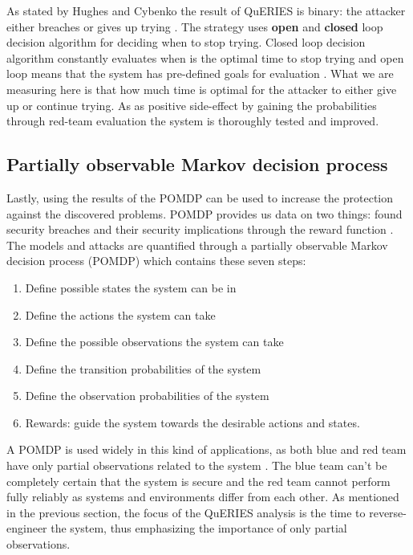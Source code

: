 As stated by Hughes and Cybenko the result of QuERIES is binary: the
attacker either breaches or gives up trying
\cite{hughes2013quantitative}. The strategy uses \textbf{open} and 
\textbf{closed} loop decision algorithm for deciding when to stop
trying. Closed loop decision algorithm constantly evaluates when is
the optimal time to stop trying and open loop means that the system
has pre-defined goals for evaluation
\cite{carin2008cybersecurity}. What we are measuring here is that how
much time is optimal for the attacker to either give up or continue
trying. As as positive side-effect by gaining the probabilities
through red-team evaluation the system is thoroughly tested and improved.

\subsection{Partially observable Markov decision process}

Lastly, using the results of the POMDP can be used to increase the
protection against the discovered problems. POMDP provides us data on
two things: found security breaches and their security implications
through the reward function \cite{carin2008cybersecurity}.  The models
and attacks are quantified through a partially observable Markov
decision process (POMDP) which contains these seven steps:

\begin{enumerate}
    \item Define possible states the system can be in
    \item Define the actions the system can take
    \item Define the possible observations the system can take
    \item Define the transition probabilities of the system
    \item Define the observation probabilities of the system
    \item Rewards: guide the system towards the desirable actions and
      states.
\end{enumerate} \cite{hughes2013quantitative}

A POMDP is used widely in this kind of applications, as both blue and
red team have only partial observations related to the system
\cite{mcabeeMarkov}. The blue team can't be completely certain that
the system is secure and the red team cannot perform fully reliably as systems and
environments differ from each other. As mentioned in the previous
section, the focus of the QuERIES analysis
is the time to reverse-engineer the system, thus emphasizing the
importance of only partial observations.
